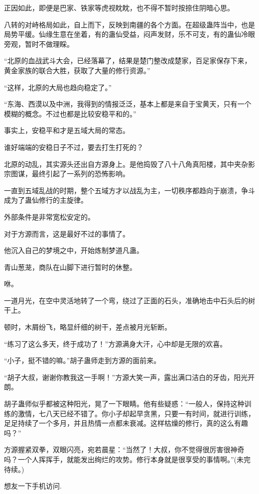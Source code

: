\begin{this_body}
正因如此，即便是巴家、铁家等虎视眈眈，也不得不暂时按捺住阴暗心思。

八转的对峙格局如此，自上而下，反映到南疆的各个方面。在超级蛊阵当中，也是局势平缓。仙缘生意在坐着，有的蛊仙受益，闷声发财，乐不可支，有的蛊仙冷眼旁观，暂时不做理睬。

“北原的血战武斗大会，已经落幕了，结果是楚门整改成楚家，百足家保存下来，黄金家族的联合大胜，获取了大量的修行资源。”

“这样，北原的大局也趋向稳定了。”

“东海、西漠以及中洲，我得到的情报泛泛，基本上都是来自于宝黄天，只有一个模糊的概念。不过也都是比较安稳平和的。”

事实上，安稳平和才是五域大局的常态。

谁好端端的安稳日子不过，要去打生打死的？

北原的动乱，其实源头还出自方源身上。是他捣毁了八十八角真阳楼，其中夹杂影宗图谋，最终引起了一系列的恐怖影响。

一直到五域乱战的时期，整个五域方才以战乱为主，一切秩序都趋向于崩溃，争斗成为了蛊仙修行的主旋律。

外部条件是非常宽松安定的。

对于方源而言，这是最好不过的事情了。

他沉入自己的梦境之中，开始炼制梦道凡蛊。

青山葱茏，商队在山脚下进行暂时的休整。

咻。

一道月光，在空中灵活地转了一个弯，绕过了正面的石头，准确地击中石头后的树干上。

顿时，木屑纷飞，略显纤细的树干，差点被月光斩断。

“练习了这么多天，终于成功了！”方源满身大汗，心中却是无限的欢喜。

“小子，挺不错的嘛。”胡子蛊师走到方源的面前来。

“胡子大叔，谢谢你教我这一手啊！”方源大笑一声，露出满口洁白的牙齿，阳光开朗。

胡子蛊师似乎都被这种阳光，晃了一下眼睛。他有些疑惑：“一般人，保持这种训练的激情，七八天已经不错了。你小子却起早贪黑，只要一有时间，就进行训练，足足持续了一个多月，并且热情一点都未衰减。这样枯燥的修行，真的这么有趣吗？”

方源握紧双拳，双眼闪亮，宛若晨星：“当然了！大叔，你不觉得很厉害很神奇吗？一个人挥挥手，就能发出绚烂的攻势。修行本身就是很享受的事情啊。”(未完待续。)

想友一下手机访问.

\end{this_body}

